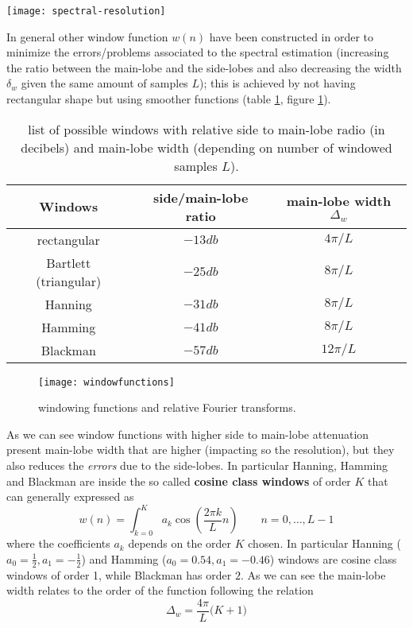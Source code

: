 	\begin{SCfigure}[2][bht]
		\centering \texttt{[image: spectral-resolution]}
		\caption{estimated spectrum of a signal $ A_1 \sin(\Omega_1t + \theta_1) + A_2 \sin(\Omega_2t + \theta_2)$ where the difference $\omega_1-\omega_2$ is negligible (upper) or not (lower) considering the problem of the spectral resolution.} \label{fig:dft:spectralresolution}
	\end{SCfigure}

	In general other window function $w(n)$ have been constructed in order to minimize the errors/problems associated to the spectral estimation (increasing the ratio between the main-lobe and the side-lobes and also decreasing the width $\delta_w$ given the same amount of samples $L$); this is achieved by not having rectangular shape but using smoother functions (table \ref{tab:dft:windowfunctions}, figure \ref{fig:dft:windowfunctions}).
	
	\begin{table} \centering
	\begin{tabular}{c|c|c}
		Windows & side/main-lobe ratio & main-lobe width $\Delta_w$\\ \hline
		rectangular & $-13db$ & $4\pi/L$ \\
		Bartlett (triangular) & $-25db$ & $8\pi/L$ \\
		Hanning & $-31db$ & $8\pi/L$ \\
		Hamming & $-41db$ & $8\pi/L$ \\
		Blackman & $-57db$ & $12\pi/L$ \\
	\end{tabular}
	\caption{list of possible windows with relative side to main-lobe radio (in decibels) and main-lobe width (depending on number of windowed samples $L$).}
	\label{tab:dft:windowfunctions}
	\end{table}
	\begin{figure}[bht]
		\centering \texttt{[image: windowfunctions]}
		\caption{windowing functions and relative Fourier transforms.}
		\label{fig:dft:windowfunctions}
	\end{figure}
		
	As we can see window functions with higher side to main-lobe attenuation  present main-lobe width that are higher (impacting so the resolution), but they also reduces the \textit{errors} due to the side-lobes. In particular Hanning, Hamming and Blackman are inside the so called \textbf{cosine class windows} of order $K$ that can generally expressed as
	\[ w(n) = \int_{k=0}^K a_k \cos\left( \frac{2\pi k}{L}n\right) \qquad n = 0,\dots, L-1 \]
	where the coefficients $a_k$ depends on the order $K$ chosen. In particular Hanning ($a_0 = \frac 1 2, a_1 = -\frac 1 2$) and Hamming ($a_0 = 0.54, a_1 = - 0.46$) windows are cosine class windows of order 1, while Blackman has order $2$. As we can see the main-lobe width relates to the order of the function following the relation
	\[ \Delta_w = \frac{4\pi}{L}\big(K+1\big) \]
	
